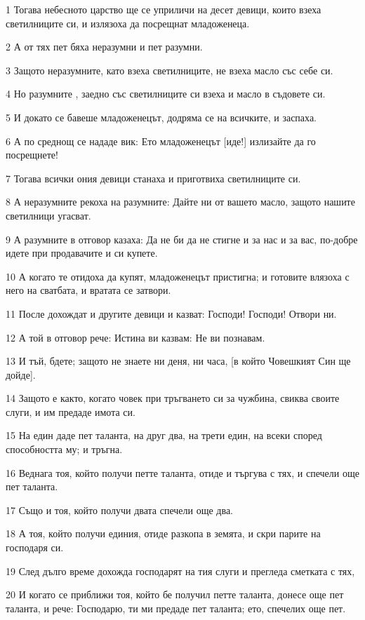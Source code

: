 \par 1 Тогава небесното царство ще се уприличи на десет девици, които взеха светилниците си, и излязоха да посрещнат младоженеца.
\par 2 А от тях пет бяха неразумни и пет разумни.
\par 3 Защото неразумните, като взеха светилниците, не взеха масло със себе си.
\par 4 Но разумните , заедно със светилниците си взеха и масло в съдовете си.
\par 5 И докато се бавеше младоженецът, додряма се на всичките, и заспаха.
\par 6 А по среднощ се нададе вик: Ето младоженецът [иде!] излизайте да го посрещнете!
\par 7 Тогава всички ония девици станаха и приготвиха светилниците си.
\par 8 А неразумните рекоха на разумните: Дайте ни от вашето масло, защото нашите светилници угасват.
\par 9 А разумните в отговор казаха: Да не би да не стигне и за нас и за вас, по-добре идете при продавачите и си купете.
\par 10 А когато те отидоха да купят, младоженецът пристигна; и готовите влязоха с него на сватбата, и вратата се затвори.
\par 11 После дохождат и другите девици и казват: Господи! Господи! Отвори ни.
\par 12 А той в отговор рече: Истина ви казвам: Не ви познавам.
\par 13 И тъй, бдете; защото не знаете ни деня, ни часа, [в който Човешкият Син ще дойде].
\par 14 Защото е както, когато човек при тръгването си за чужбина, свиква своите слуги, и им предаде имота си.
\par 15 На един даде пет таланта, на друг два, на трети един, на всеки според способността му; и тръгна.
\par 16 Веднага тоя, който получи петте таланта, отиде и търгува с тях, и спечели още пет таланта.
\par 17 Също и тоя, който получи двата спечели още два.
\par 18 А тоя, който получи единия, отиде разкопа в земята, и скри парите на господаря си.
\par 19 След дълго време дохожда господарят на тия слуги и прегледа сметката с тях,
\par 20 И когато се приближи тоя, който бе получил петте таланта, донесе още пет таланта, и рече: Господарю, ти ми предаде пет таланта; ето, спечелих още пет.
